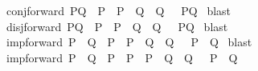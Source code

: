 \begin{isabellebody}
\begin{isamarkuptext}
\end{isamarkuptext}\isamarkuptrue%
\isamarkupfalse%
\ conj{\isacharunderscore}{\kern0pt}forward{\isacharcolon}{\kern0pt}\ {\isachardoublequoteopen}{\isasymlbrakk}P{\isacharprime}{\kern0pt}{\isasymand}Q{\isacharprime}{\kern0pt}{\isacharsemicolon}{\kern0pt}\ \ P{\isacharprime}{\kern0pt}\ {\isasymLongrightarrow}\ P{\isacharsemicolon}{\kern0pt}\ \ Q{\isacharprime}{\kern0pt}\ {\isasymLongrightarrow}\ Q\ {\isasymrbrakk}\ {\isasymLongrightarrow}\ P{\isasymand}Q{\isachardoublequoteclose}\isanewline
%
\isadelimproof
%
\endisadelimproof
%
\isatagproof
{}\isamarkupfalse%
\ blast%
\endisatagproof
{\isafoldproof}%
%
\isadelimproof
\isanewline
%
\endisadelimproof
\isanewline
{}\isamarkupfalse%
\ disj{\isacharunderscore}{\kern0pt}forward{\isacharcolon}{\kern0pt}\ {\isachardoublequoteopen}{\isasymlbrakk}P{\isacharprime}{\kern0pt}{\isasymor}Q{\isacharprime}{\kern0pt}{\isacharsemicolon}{\kern0pt}\ \ P{\isacharprime}{\kern0pt}\ {\isasymLongrightarrow}\ P{\isacharsemicolon}{\kern0pt}\ \ Q{\isacharprime}{\kern0pt}\ {\isasymLongrightarrow}\ Q\ {\isasymrbrakk}\ {\isasymLongrightarrow}\ P{\isasymor}Q{\isachardoublequoteclose}\isanewline
%
\isadelimproof
%
\endisadelimproof
%
\isatagproof
{}\isamarkupfalse%
\ blast%
\endisatagproof
{\isafoldproof}%
%
\isadelimproof
\isanewline
%
\endisadelimproof
\isanewline
{}\isamarkupfalse%
\ imp{\isacharunderscore}{\kern0pt}forward{\isacharcolon}{\kern0pt}\ {\isachardoublequoteopen}{\isasymlbrakk}P{\isacharprime}{\kern0pt}\ {\isasymlongrightarrow}\ Q{\isacharprime}{\kern0pt}{\isacharsemicolon}{\kern0pt}\ \ P\ {\isasymLongrightarrow}\ P{\isacharprime}{\kern0pt}{\isacharsemicolon}{\kern0pt}\ \ Q{\isacharprime}{\kern0pt}\ {\isasymLongrightarrow}\ Q\ {\isasymrbrakk}\ {\isasymLongrightarrow}\ P\ {\isasymlongrightarrow}\ Q{\isachardoublequoteclose}\isanewline
%
\isadelimproof
%
\endisadelimproof
%
\isatagproof
{}\isamarkupfalse%
\ blast%
\endisatagproof
{\isafoldproof}%
%
\isadelimproof
\isanewline
%
\endisadelimproof
\isanewline
{}\isamarkupfalse%
\ imp{\isacharunderscore}{\kern0pt}forward{}{\isacharcolon}{\kern0pt}\ {\isachardoublequoteopen}{\isasymlbrakk}P{\isacharprime}{\kern0pt}\ {\isasymlongrightarrow}\ Q{\isacharprime}{\kern0pt}{\isacharsemicolon}{\kern0pt}\ \ P\ {\isasymLongrightarrow}\ P{\isacharprime}{\kern0pt}{\isacharsemicolon}{\kern0pt}\ \ P{\isacharprime}{\kern0pt}\ {\isasymLongrightarrow}\ Q{\isacharprime}{\kern0pt}\ {\isasymLongrightarrow}\ Q\ {\isasymrbrakk}\ {\isasymLongrightarrow}\ P\ {\isasymlongrightarrow}\ Q{\isachardoublequoteclose}\isanewline

\end{isabellebody}
